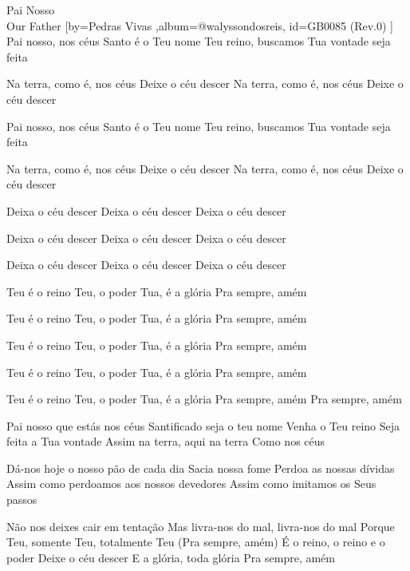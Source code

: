 \beginsong
{Pai Nosso \\ Our Father %
}[by={Pedras Vivas %
},album={@walyssondosreis},
id={GB0085 %
(Rev.0) %
}]
Pai nosso, nos céus
Santo é o Teu nome
Teu reino, buscamos
Tua vontade seja feita

Na terra, como é, nos céus
Deixe o céu descer
Na terra, como é, nos céus
Deixe o céu descer

Pai nosso, nos céus
Santo é o Teu nome
Teu reino, buscamos
Tua vontade seja feita

Na terra, como é, nos céus
Deixe o céu descer
Na terra, como é, nos céus
Deixe o céu descer

Deixa o céu descer
Deixa o céu descer
Deixa o céu descer

Deixa o céu descer
Deixa o céu descer
Deixa o céu descer

Deixa o céu descer
Deixa o céu descer
Deixa o céu descer

Teu é o reino
Teu, o poder
Tua, é a glória
Pra sempre, amém

Teu é o reino
Teu, o poder
Tua, é a glória
Pra sempre, amém

Teu é o reino
Teu, o poder
Tua, é a glória
Pra sempre, amém

Teu é o reino
Teu, o poder
Tua, é a glória
Pra sempre, amém

Teu é o reino
Teu, o poder
Tua, é a glória
Pra sempre, amém
Pra sempre, amém

Pai nosso que estás nos céus
Santificado seja o teu nome
Venha o Teu reino
Seja feita a Tua vontade
Assim na terra, aqui na terra
Como nos céus

Dá-nos hoje o nosso pão de cada dia
Sacia nossa fome
Perdoa as nossas dívidas
Assim como perdoamos aos nossos devedores
Assim como imitamos os Seus passos

Não nos deixes cair em tentação
Mas livra-nos do mal, livra-nos do mal
Porque Teu, somente Teu, totalmente Teu
(Pra sempre, amém)
É o reino, o reino e o poder
Deixe o céu descer
E a glória, toda glória
Pra sempre, amém


